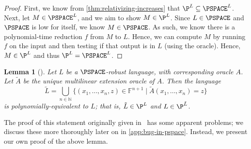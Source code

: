 \documentclass[english,12pt]{reedthesis}
\theoremstyle{plain}
\newtheorem{lemma}[lemma]{Lemma}
\theoremstyle{definition}
\theoremstyle{remark}
\begin{document}
\begin{proof}
  First, we know from \cref{thm:relativizing-increases} that
  $\P^{L} \subseteq \PSPACE^{L}$. Next, let $M \in \PSPACE^{L}$, and we aim to show
  $M \in \P^{L}$. Since $L \in \PSPACE$ and $\PSPACE$ is low for itself, we know
  $M \in \PSPACE$. As such, we know there is a polynomial-time reduction $f$ from
  $M$ to $L$. Hence, we can compute $M$ by running $f$ on the input and then
  testing if that output is in $L$ (using the oracle). Hence, $M \in \P^{L}$ and
  thus $\P^{L} = \PSPACE^{L}$.
\end{proof}

\begin{lemma}[{\cite[Lemma 6.2]{BFL90}}]\label{lem:multilinear-is-pspace}
  Let $L$ be a $\PSPACE$-robust language, with corresponding oracle $A$. Let
  $\tilde{A}$ be the unique multilinear extension oracle of $A$. Then the
  language
  \begin{equation}
    \tilde{L} = \bigcup_{n \in \mathbb{N}}\{(x_{1}, \ldots, x_{n}, z) \in \mathbb{F}^{n+1} \mid \tilde{A}(x_{1}, \ldots, x_{n}) = z\}
  \end{equation}
  is polynomially-equivalent to $L$; that is, $\tilde{L} \in \P^{L}$ and
  $L \in \P^{\tilde{L}}$.
\end{lemma}

The proof of this statement originally given in~\cite{BFL90} has some apparent
problems; we discuss these more thoroughly later on in \cref{app:bug-in-pspace}.
Instead, we present our own proof of the above lemma.
\end{document}
